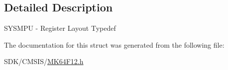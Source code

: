 \subsection{Detailed Description}
S\+Y\+S\+M\+PU -\/ Register Layout Typedef 

The documentation for this struct was generated from the following file\+:\begin{DoxyCompactItemize}
\item 
S\+D\+K/\+C\+M\+S\+I\+S/\mbox{\hyperlink{_m_k64_f12_8h}{M\+K64\+F12.\+h}}\end{DoxyCompactItemize}
